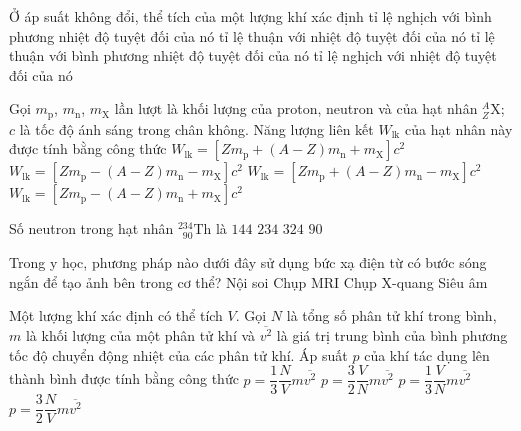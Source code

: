 	\begin{ex}%
		Ở áp suất không đổi, thể tích của một lượng khí xác định
		\choice
		{tỉ lệ nghịch với bình phương nhiệt độ tuyệt đối của nó}
		{\True tỉ lệ thuận với nhiệt độ tuyệt đối của nó}
		{tỉ lệ thuận với bình phương nhiệt độ tuyệt đối của nó}
		{tỉ lệ nghịch với nhiệt độ tuyệt đối của nó}
	\end{ex}

	\begin{ex}%
		Gọi $m_\text{p}$, $m_\text{n}$, $m_\text{X}$ lần lượt là khối lượng của proton, neutron và của hạt nhân ${}^A_Z\text{X}$; $c$ là tốc độ ánh sáng trong chân không. Năng lượng liên kết $W_{\text{lk}}$ của hạt nhân này được tính bằng công thức
		\choice
		{$W_{\text{lk}}=[Zm_\text{p}+(A-Z)m_\text{n}+m_\text{X}]c^2$}
		{$W_{\text{lk}}=[Zm_\text{p}-(A-Z)m_\text{n}-m_\text{X}]c^2$}
		{\True $W_{\text{lk}}=[Zm_\text{p}+(A-Z)m_\text{n}-m_\text{X}]c^2$}
		{$W_{\text{lk}}=[Zm_\text{p}-(A-Z)m_\text{n}+m_\text{X}]c^2$}
	\end{ex}

	\begin{ex}%
		Số neutron trong hạt nhân $^{234}_{\phantom{2}90}\text{Th}$ là
		\choice
		{\True $144$}
		{$234$}
		{$324$}
		{$90$}
	\end{ex}

	\begin{ex}%
		Trong y học, phương pháp nào dưới đây sử dụng bức xạ điện từ có bước sóng ngắn để tạo ảnh bên trong cơ thể?
		\choice
		{Nội soi}
		{Chụp MRI}
		{\True Chụp X-quang}
		{Siêu âm}
	\end{ex}

	\begin{ex}%
		Một lượng khí xác định có thể tích $V$. Gọi $N$ là tổng số phân tử khí trong bình, $m$ là khối lượng của một phân tử khí và $\overline{v^2}$ là giá trị trung bình của bình phương tốc độ chuyển động nhiệt của các phân tử khí. Áp suất $p$ của khí tác dụng lên thành bình được tính bằng công thức
		\choice
		{\True $p=\dfrac{1}{3}\dfrac{N}{V}m\overline{v^2}$}
		{$p=\dfrac{3}{2}\dfrac{V}{N}m\overline{v^2}$}
		{$p=\dfrac{1}{3}\dfrac{V}{N}m\overline{v^2}$}
		{$p=\dfrac{3}{2}\dfrac{N}{V}m\overline{v^2}$}
	\end{ex}

